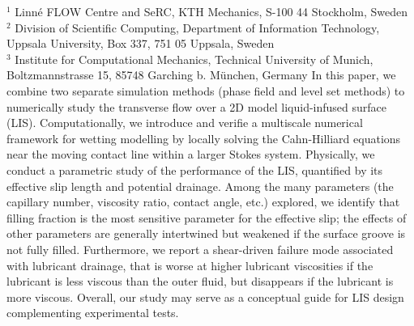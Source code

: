 %
%
%
%
%
%
%
\paperaffiliation
{%
  $^1$ Linn\'e FLOW Centre and SeRC, KTH Mechanics, S-100 44 Stockholm, Sweden\\%
  $^2$ Division of Scientific Computing, Department of Information Technology, \\Uppsala University, Box 337, 751 05 Uppsala, Sweden\\%
  $^3$ Institute for Computational Mechanics, Technical University of Munich, Boltzmannstrasse 15, 85748 Garching b. München, Germany%
}%
%
%
%
%
%
%
%
\paperpages{}%
%
%
%
\papersummary%
{%
   In this paper, we combine two separate simulation methods (phase field and level set methods) to numerically study
   the transverse flow over a 2D model liquid-infused surface (LIS).
   Computationally, we introduce and verifie a multiscale numerical framework for wetting modelling
   by locally solving the Cahn-Hilliard equations near the moving contact line within a larger Stokes system.
   Physically, we conduct a parametric study of the performance of the LIS, quantified by its effective slip length and potential drainage.
   Among the many parameters (the capillary number, viscosity ratio, contact angle, etc.) explored,
   we identify that filling fraction is the most sensitive parameter for the effective slip;
   the effects of other parameters are generally intertwined but weakened if the surface groove is not fully filled.
   Furthermore, we report a shear-driven failure mode associated with lubricant drainage,
   that is worse at higher lubricant viscosities if the lubricant is less viscous than the outer fluid,
   but disappears if the lubricant is more viscous.
   Overall, our study may serve as a conceptual guide for LIS design complementing experimental tests.
}%
